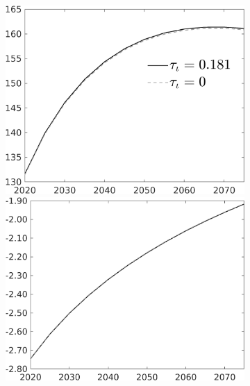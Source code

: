 \begin{figure}[h!!]
\begin{subfigure}{0.75\textwidth}
\begin{minipage}[]{0.32\textwidth}
			\end{minipage}
			\begin{minipage}[]{0.32\textwidth}
			\captionsetup{width=.45\linewidth}				\includegraphics[width=1\textwidth]{../../codding_model/own_basedOnFried/optimalPol_010922_revision/figures/all_13Sept22/PerdifNoTauf_Equlab_regime5_CompTaul_G_spillover0_nsk0_xgr0_knspil0_sep0_LFlimit0_emsbase0_countec0_GovRev0_etaa0.79_lgd1.png}
		\end{minipage}
			\begin{minipage}[]{0.32\textwidth}
				\includegraphics[width=1\textwidth]{../../codding_model/own_basedOnFried/optimalPol_010922_revision/figures/all_13Sept22/PerdifNoTauf_Equlab_regime5_CompTaul_EY_spillover0_nsk0_xgr0_knspil0_sep0_LFlimit0_emsbase0_countec0_GovRev0_etaa0.79_lgd0.png}

\end{minipage}
\end{subfigure}
\end{figure}
